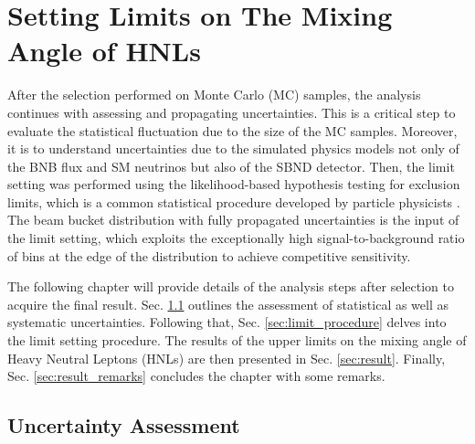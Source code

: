 \chapter{Setting Limits on The Mixing Angle of HNLs}
\label{ChapterResult}

\ifpdf
    \graphicspath{{Chapter10/Figs/Raster/}{Chapter10/Figs/PDF/}{Chapter10/Figs/}}
\else
    \graphicspath{{Chapter10/Figs/Vector/}{Chapter10/Figs/}}
\fi


After the selection performed on Monte Carlo (MC) samples, the analysis continues with assessing and propagating uncertainties.
This is a critical step to evaluate the statistical fluctuation due to the size of the MC samples.
Moreover, it is to understand uncertainties due to the simulated physics models not only of the BNB flux and SM neutrinos but also of the SBND detector.   
Then, the limit setting was performed using the likelihood-based hypothesis testing for exclusion limits, 
which is a common statistical procedure developed by particle physicists \cite{asymptotic_test}.
The beam bucket distribution with fully propagated uncertainties is the input of the limit setting, which exploits the exceptionally high signal-to-background ratio of bins at the edge of the distribution to achieve competitive sensitivity.

The following chapter will provide details of the analysis steps after selection to acquire the final result.
Sec. \ref{sec:uncertainty} outlines the assessment of statistical as well as systematic uncertainties. 
Following that, Sec. \ref{sec:limit_procedure} delves into the limit setting procedure.
The results of the upper limits on the mixing angle of Heavy Neutral Leptons (HNLs) are then presented in Sec. \ref{sec:result}.
Finally, Sec. \ref{sec:result_remarks} concludes the chapter with some remarks.

\clearpage

\section{Uncertainty Assessment}
\label{sec:uncertainty}

